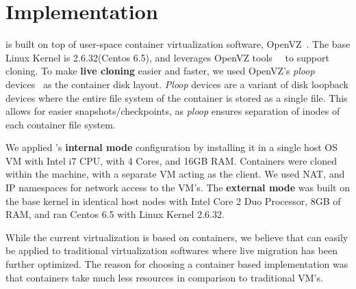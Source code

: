 

\section{Implementation}
\label{sec:implementation}

\parikshan is built on top of user-space container virtualization software, OpenVZ~\cite{openvz}. 
The base Linux Kernel is 2.6.32(Centos 6.5), and leverages OpenVZ tools~\cite{vzctl}~\cite{mirkin2008containers} to support cloning.
To make \textbf{live cloning} easier and faster, we used OpenVZ's \textit{ploop} devices~\cite{ploop} as the container disk layout. 
\textit{Ploop} devices are a variant of disk loopback devices where the entire file system of the container is stored as a single file. 
This allows for easier snapshots/checkpoints, as \textit{ploop} ensures separation of inodes of each container file system.

We applied \parikshan 's \textbf{internal mode} configuration by installing it in a single host OS VM with Intel i7 CPU, with 4 Cores, and 16GB RAM. 
Containers were cloned within the machine, with a separate VM acting as the client.
We used NAT, and IP namespaces for network access to the VM's.
The \textbf{external mode} was built on the base kernel in identical host nodes with Intel Core 2 Duo Processor, 8GB of RAM, and ran Centos 6.5 with Linux Kernel 2.6.32.

While the current virtualization is based on containers, we believe that \parikshan can easily be applied to traditional virtualization softwares where live migration has been further optimized.
The reason for choosing a container based implementation was that containers take much less resources in comparison to traditional VM's.

